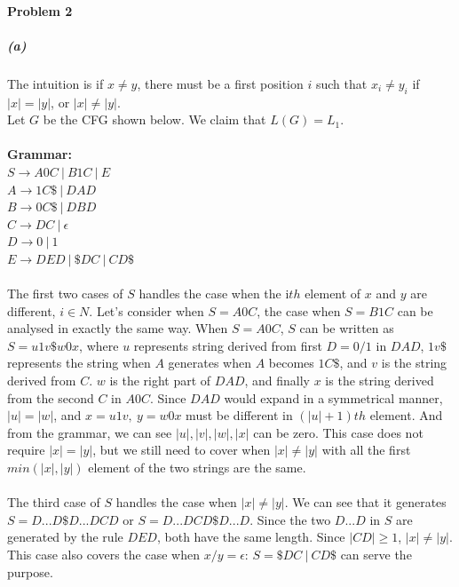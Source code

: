 \documentclass[letterpaper, 12pt]{article}
\theoremstyle{definition}
\numberwithin{equation}{section}
\begin{document}
\newpage

\paragraph{Problem 2}
\subparagraph{(a)} The intuition is if $x \neq y$, there must be a first position $i$ such that $x_i \neq y_i$ if $|x| = |y|$, or $|x| \neq |y|$. \\
Let $G$ be the CFG shown below. We claim that $L(G) = L_1$. \\~\\
\textbf{Grammar:} \\
$S \rightarrow A0C\ |\ B1C\ |\ E$ \\
$A \rightarrow 1C\$\ |\ DAD$ \\
$B \rightarrow 0C\$\ |\ DBD $ \\
$C \rightarrow DC\ |\ \epsilon$ \\
$D \rightarrow 0\ |\ 1$ \\
$E \rightarrow DED\ |\ \$DC\ |\ CD\$$ \\~\\

The first two cases of $S$ handles the case when the i$th$ element of $x$ and $y$ are different, $i \in N$. Let's consider when $S = A0C$, the case when $S=B1C$ can be analysed in exactly the same way. When $S = A0C$, $S$ can be written as $S = u1v\$w0x$, where $u$ represents string derived from first $D = 0/1$ in $DAD$, $1v\$$ represents the string when $A$ generates when $A$ becomes $1C\$$, and $v$ is the string derived from $C$. $w$ is the right part of $DAD$, and finally $x$ is the string derived from the second $C$ in $A0C$. Since $DAD$ would expand in a symmetrical manner, $|u| = |w|$, and $x=u1v,\ y=w0x$ must be different in $(|u|+1)th$ element. And from the grammar, we can see $|u|, |v|, |w|, |x|$ can be zero. This case does not require $|x| = |y|$, but we still need to cover when $|x| \neq |y|$ with all the first $min(|x|,|y|)$ element of the two strings are the same.\\~\\

The third case of $S$ handles the case when $|x| \neq |y|$. We can see that it generates $S = D...D\$D...DCD$ or $S = D...DCD\$D...D$. Since the two $D...D$ in $S$ are generated by the rule $DED$, both have the same length. Since $|CD| \geq 1$, $|x| \neq |y|$. This case also covers the case when $x/y = \epsilon$: $S=\$DC\ |\ CD\$$ can serve the purpose. \\~\\
\end{document}
